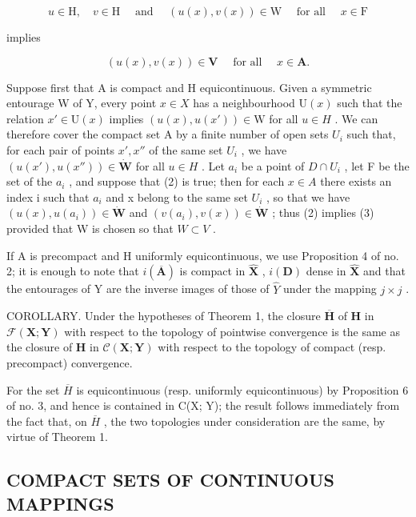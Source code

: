 \[
u \in \mathrm{H}, \quad v \in \mathrm{H} \quad \text { and } \quad (u (x), v (x)) \in \mathrm{W} \quad \text { for   all } \quad x \in \mathrm{F}\tag{2}
\]

implies

\[
(u (x), v (x)) \in \mathbf {V} \quad \text { for   all } \quad x \in \mathbf {A}.\tag{3}
\]

Suppose first that A is compact and H equicontinuous. Given a symmetric entourage W of Y, every point \(x \in X\) has a neighbourhood \(\mathrm{U}(x)\) such that the relation \(x' \in \mathrm{U}(x)\) implies \((u(x), u(x')) \in \mathrm{W}\) for all \(u \in H\) . We can therefore cover the compact set A by a finite number of open sets \(U_i\) such that, for each pair of points \(x', x''\) of the same set \(U_i\) , we have \((u(x'), u(x'')) \in \dot{\mathbf{W}}\) for all \(u \in H\) . Let \(a_i\) be a point of \(D \cap U_i\) , let F be the set of the \(a_i\) , and suppose that (2) is true; then for each \(x \in A\) there exists an index i such that \(a_i\) and x belong to the same set \(U_i\) , so that we have \((u(x), u(a_i)) \in \dot{\mathbf{W}}\) and \((v(a_i), v(x)) \in \dot{\mathbf{W}}\) ; thus (2) implies (3) provided that W is chosen so that \(W \subset V\) .

If A is precompact and H uniformly equicontinuous, we use Proposition 4 of no. 2; it is enough to note that \(i(\overline{\mathbf{A}})\) is compact in \(\hat{\mathbf{X}}\) , \(i(\mathbf{D})\) dense in \(\hat{\mathbf{X}}\) and that the entourages of Y are the inverse images of those of \(\hat{Y}\) under the mapping \(j \times j\) .

COROLLARY. Under the hypotheses of Theorem 1, the closure \(\overline{\mathbf{H}}\) of \(\mathbf{H}\) in \(\mathcal{F}(\mathbf{X};\mathbf{Y})\) with respect to the topology of pointwise convergence is the same as the closure of \(\mathbf{H}\) in \(\mathcal{C}(\mathbf{X};\mathbf{Y})\) with respect to the topology of compact (resp. precompact) convergence.

For the set \(\overline{H}\) is equicontinuous (resp. uniformly equicontinuous) by Proposition 6 of no. 3, and hence is contained in C(X; Y); the result follows immediately from the fact that, on \(\overline{H}\) , the two topologies under consideration are the same, by virtue of Theorem 1.

\subsection{COMPACT SETS OF CONTINUOUS MAPPINGS}

